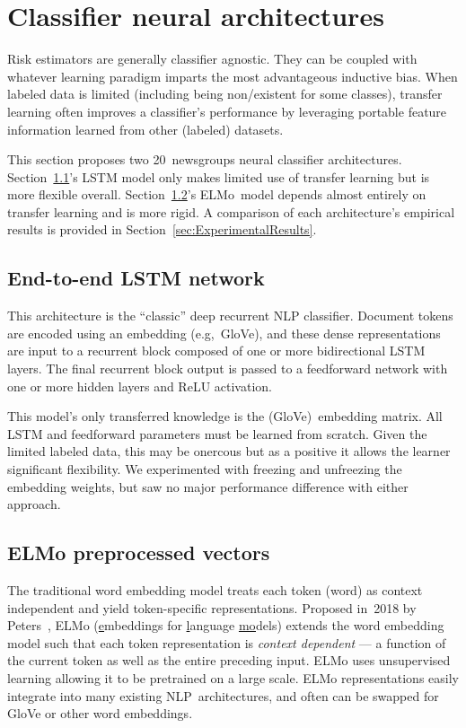 \section{Classifier neural architectures}\label{sec:Architectures}

Risk estimators are generally classifier agnostic.  They can be coupled with whatever learning paradigm imparts the most advantageous inductive bias. When labeled data is limited (including being non\-/existent for some classes), transfer learning often improves a classifier's performance by leveraging portable feature information learned from other (labeled) datasets.

This section proposes two 20~newsgroups neural classifier architectures.  Section~\ref{sec:Architectures:LSTM}'s LSTM model only makes limited use of transfer learning but is more flexible overall.  Section~\ref{sec:Architectures:ELMo}'s ELMo~model depends almost entirely on transfer learning and is more rigid. A comparison of each architecture's empirical results is provided in Section~\ref{sec:ExperimentalResults}.

\subsection{End-to-end LSTM network}\label{sec:Architectures:LSTM}

This architecture is the ``classic'' deep recurrent NLP classifier. Document tokens are encoded using an embedding (e.g,~GloVe), and these dense representations are input to a recurrent block composed of one or more bidirectional LSTM layers.  The final recurrent block output is passed to a feedforward network with one or more hidden layers and ReLU activation.

This model's only transferred knowledge is the (GloVe)~embedding matrix. All LSTM and feedforward parameters must be learned from scratch.  Given the limited labeled data, this may be onercous but as a positive it allows the learner significant flexibility.  We experimented with freezing and unfreezing the embedding weights, but saw no major performance difference with either approach.

\subsection{ELMo preprocessed vectors}\label{sec:Architectures:ELMo}

The traditional word embedding model treats each token (word) as context independent and yield token-specific representations. Proposed in~2018 by Peters\etal~\cite{Peters:2018}, ELMo (\underline{e}mbeddings for \underline{l}anguage \underline{mo}dels) extends the word embedding model such that each token representation is \textit{context dependent} --- a function of the current token as well as the entire preceding input.  ELMo uses unsupervised learning allowing it to be pretrained on a large scale.  ELMo representations easily integrate into many existing NLP~architectures, and often can be swapped for GloVe or other word embeddings.

